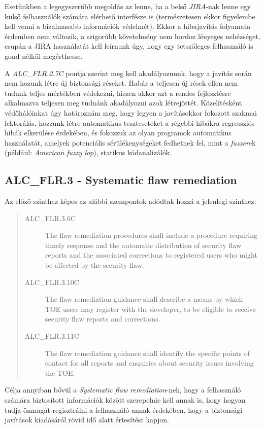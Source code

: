 Esetünkben a legegyszerűbb megoldás az lenne, ha a belső \emph{JIRA}-nak lenne egy külső
felhasználók számára elérhető interfésze is (természetesen ekkor figyelembe kell venni a bizalmasabb
információk védelmét). Ekkor a hibajavítás folyamata érdemben nem változik, a szigorúbb követelmény
nem hordoz lényeges nehézséget, csupán a JIRA használatát kell leírnunk úgy, hogy egy tetszőleges
felhasználó is gond nélkül megérthesse.

A \emph{ALC\_FLR.2.7C} pontja szerint meg kell akadályoznunk, hogy a javítás során nem hozunk létre
új biztonsági réseket. Habár a teljesen új rések ellen nem tudunk teljes mértékben védekezni, hiszen
akkor azt a rendes fejlesztésre alkalmazva teljesen meg tudnánk akadályozni azok létrejöttét.
Közelítésként védőhálóinkat úgy határoznám meg, hogy legyen a javításokkor fokozott szakmai
lektorálás, hozzunk létre automatikus teszteseteket a régebbi hibákra regressziós hibák elkerülése
érdekében, és fokozzuk az olyan programok automatikus használatát, amelyek potenciális
sérülékenységeket fedhetnek fel, mint a \emph{fuzzer}ek (például: \emph{American fuzzy lop}),
statikus kódanalizálók.

\subsection{ALC\_FLR.3 - Systematic flaw remediation}

Az előző szinthez képes az alábbi szempontok adódtak hozzá a jelenlegi szinthez:
\begin{quote}
    \begin{description}
        \item[ALC\_FLR.3.6C]{The flaw remediation procedures shall include a procedure requiring
            timely response and the automatic distribution of security flaw reports and the
            associated corrections to registered users who might be affected by the security flaw.}
        \item[ALC\_FLR.3.10C]{The flaw remediation guidance shall describe a means by which TOE
            users may register with the developer, to be eligible to receive security flaw reports
            and corrections.}
        \item[ALC\_FLR.3.11C]{The flaw remediation guidance shall identify the specific points of
            contact for all reports and enquiries about security issues involving the TOE.}
    \end{description}
\end{quote}
Célja annyiban bővül a \emph{Systematic flaw remediation}-nek, hogy a felhasználó számára
biztosított információk között szerepelnie kell annak is, hogy hogyan tudja önmagát regisztrálni
a felhasználó annak érdekében, hogy a biztonsági javítások kiadásáról rövid idő alatt értesítést
kapjon.

